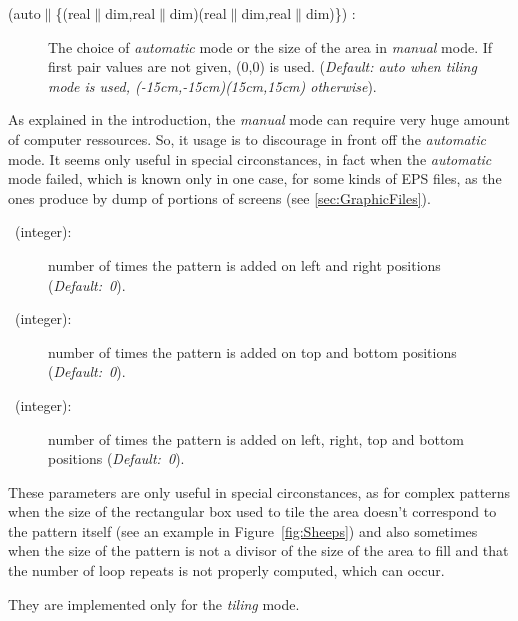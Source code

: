 \documentclass[fontsize=11pt,english,BCOR=10mm,DIV=12,bibliography=totoc,parskip=false,
   headings=small, headinclude=false,footinclude=false,oneside]{pst-doc}
\begin{document}
\begin{LTXexample}
\psboxfill{\Square}
\quad 
{}\quad
{}\quad
{}
\end{LTXexample}

\begin{description}
  \item [
  (auto$\|$\{(real$\|$dim,real$\|$dim)(real$\|$dim,real$\|$dim)\}) :] The
  choice of \emph{automatic} mode or the size of the area in \emph{manual}
  mode. If first pair values are not given, (0,0) is used. (\emph{Default:
  auto when \emph{tiling} mode is used, {(-15cm,-15cm)(15cm,15cm)}
  otherwise}).
\end{description}

  As explained in the introduction, the \emph{manual} mode can require very
huge amount of computer ressources. So, it usage is to discourage in front off
the \emph{automatic} mode. It seems only useful in special circonstances, in
fact when the \emph{automatic} mode failed, which is known only in one case,
for some kinds of EPS files, as the ones produce by dump of portions of
screens (see \ref{sec:GraphicFiles}).

\begin{description}
  \item [\footnotemark\ (integer)\hfill :] number of
  times the pattern is added on left and right positions (\emph{Default:~0}).
  \item [\footnotemark\ (integer)\hfill :] number of
  times the pattern is added on top and bottom positions (\emph{Default:~0}).
  \item [\footnotemark\ (integer)\hfill :] number of
  times the pattern is added on left, right, top and bottom positions
  (\emph{Default:~0}).
\end{description}

  These parameters are only useful in special circonstances, as for complex
patterns when the size of the rectangular box used to tile the area doesn't 
correspond to the pattern itself (see an example in Figure~\ref{fig:Sheeps})
and also sometimes when the size of the pattern is not a divisor of the size
of the area to fill and that the number of loop repeats is not properly
computed, which can occur.

  They are implemented only for the \emph{tiling} mode.
\end{document}
